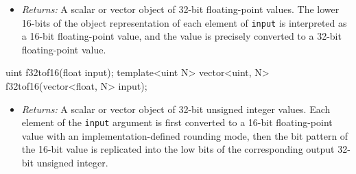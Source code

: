 \begin{itemize}
  \item \textit{Returns:} A scalar or vector object of 32-bit floating-point
  values. The lower 16-bits of the object representation of each element of
  \texttt{input} is interpreted as a 16-bit floating-point value, and the value
  is precisely converted to a 32-bit floating-point value.
\end{itemize}

\begin{HLSL}
uint f32tof16(float input);
template<uint N> vector<uint, N> f32tof16(vector<float, N> input);
\end{HLSL}

\begin{itemize}
  \item \textit{Returns:} A scalar or vector object of 32-bit unsigned integer
  values. Each element of the \texttt{input} argument is first converted to a
  16-bit floating-point value with an implementation-defined rounding mode, then
  the bit pattern of the 16-bit value is replicated into the low bits of the
  corresponding output 32-bit unsigned integer.
\end{itemize}

